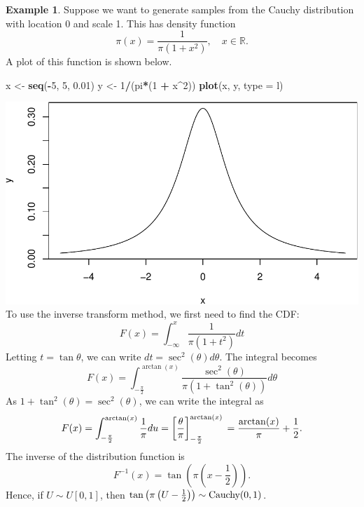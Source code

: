 \documentclass[
]{book}
\newenvironment{Shaded}{\begin{snugshade}}{\end{snugshade}}
\newcommand{\AttributeTok}[1]{\textcolor[rgb]{0.13,0.29,0.53}{#1}}
\newcommand{\DecValTok}[1]{\textcolor[rgb]{0.00,0.00,0.81}{#1}}
\newcommand{\FloatTok}[1]{\textcolor[rgb]{0.00,0.00,0.81}{#1}}
\newcommand{\FunctionTok}[1]{\textcolor[rgb]{0.13,0.29,0.53}{\textbf{#1}}}
\newcommand{\NormalTok}[1]{#1}
\newcommand{\OtherTok}[1]{\textcolor[rgb]{0.56,0.35,0.01}{#1}}
\newcommand{\SpecialCharTok}[1]{\textcolor[rgb]{0.81,0.36,0.00}{\textbf{#1}}}
\newcommand{\StringTok}[1]{\textcolor[rgb]{0.31,0.60,0.02}{#1}}
\theoremstyle{definition}
\theoremstyle{definition}
\newtheorem{example}{Example}[chapter]
\theoremstyle{definition}
\theoremstyle{definition}
\theoremstyle{remark}
\begin{document}
\begin{example}
Suppose we want to generate samples from the Cauchy distribution with location 0 and scale 1. This has density function
\[
\pi(x) = \frac{1}{\pi(1+x^2)}, \quad x \in \mathbb{R}.
\]
A plot of this function is shown below.

\begin{Shaded}
\begin{Highlighting}[]
\NormalTok{x }\OtherTok{\textless{}{-}} \FunctionTok{seq}\NormalTok{(}\SpecialCharTok{{-}}\DecValTok{5}\NormalTok{, }\DecValTok{5}\NormalTok{, }\FloatTok{0.01}\NormalTok{)}
\NormalTok{y }\OtherTok{\textless{}{-}} \DecValTok{1}\SpecialCharTok{/}\NormalTok{(pi}\SpecialCharTok{*}\NormalTok{(}\DecValTok{1} \SpecialCharTok{+}\NormalTok{ x}\SpecialCharTok{\^{}}\DecValTok{2}\NormalTok{))}
\FunctionTok{plot}\NormalTok{(x, y, }\AttributeTok{type =} \StringTok{\textquotesingle{}l\textquotesingle{}}\NormalTok{)}
\end{Highlighting}
\end{Shaded}

\includegraphics{_main_files/figure-latex/unnamed-chunk-24-1.pdf}
To use the inverse transform method, we first need to find the CDF:
\[
F(x) = \int_{-\infty}^x \frac{1}{\pi(1+t^2)}dt
\]
Letting \(t = \tan \theta\), we can write \(dt = \sec^2(\theta)d\theta\). The integral becomes
\[
F(x) = \int_{-\frac{\pi}{2}}^{\arctan(x)} \frac{\sec^2(\theta)}{\pi(1+\tan^2(\theta))} d\theta
\]
As \(1 + \tan^2(\theta) = \sec^2(\theta)\), we can write the integral as
\[
F(x) = \int_{-\frac{\pi}{2}}^{\arctan(x)} \frac{1}{\pi}du\\
= \left[\frac{\theta}{\pi}\right]_{-\frac{\pi}{2}}^{\arctan(x)}\\
= \frac{\arctan(x)}{\pi} + \frac{1}{2}.
\]
The inverse of the distribution function is
\[
F^{-1}(x) = \tan\left(\pi\left(x - \frac{1}{2}\right)\right).
\]
Hence, if \(U \sim U[0, 1]\), then \(\tan\left(\pi\left(U - \frac{1}{2}\right)\right) \sim \hbox{Cauchy}(0, 1)\).
\end{example}
\end{document}
